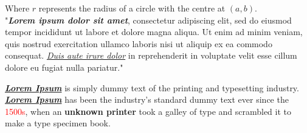 Where $r$ represents the radius of a circle with the centre at $(a,b)$.\\

"\textbf{\emph{Lorem ipsum dolor sit amet}}, consectetur adipiscing elit, sed do eiusmod tempor incididunt ut labore et dolore magna aliqua. Ut enim ad minim veniam, quis nostrud exercitation ullamco laboris nisi ut aliquip ex ea commodo consequat. \underline{\emph{Duis aute irure dolor}} in reprehenderit in voluptate velit esse cillum dolore eu fugiat nulla pariatur."

\textbf{\underline{\emph{Lorem Ipsum}}} is simply dummy text of the printing and typesetting industry. \textbf{\underline{\emph{Lorem Ipsum}}} has been the industry's standard dummy text ever since the \textcolor{red}{1500s}, when an \textbf{unknown printer} took a galley of type and scrambled it to make a type specimen book.